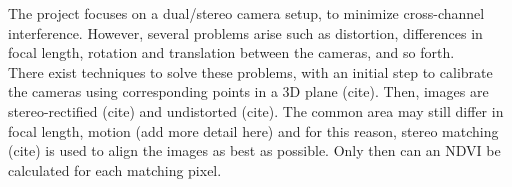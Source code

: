 The project focuses on a dual/stereo camera setup, to minimize cross-channel interference. However, several problems arise such as distortion, differences in focal length, rotation and translation between the cameras, and so forth.\\

There exist techniques to solve these problems, with an initial step to calibrate the cameras using corresponding points in a 3D plane (cite). Then, images are stereo-rectified (cite) and undistorted (cite). The common area may still differ in focal length, motion (add more detail here) and for this reason, stereo matching (cite) is used to align the images as best as possible. Only then can an NDVI be calculated for each matching pixel.

